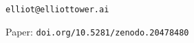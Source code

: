 \documentclass[25pt, a0paper, portrait]{tikzposter}
\begin{document}
\begin{columns}
{{  \vspace{3mm}
  \begin{center}
  \texttt{elliot@elliottower.ai}

  \vspace{2mm}
  {\small Paper:}
  \texttt{doi.org/10.5281/zenodo.20478480}
  \end{center}
}
}

\end{columns}
\end{document}
